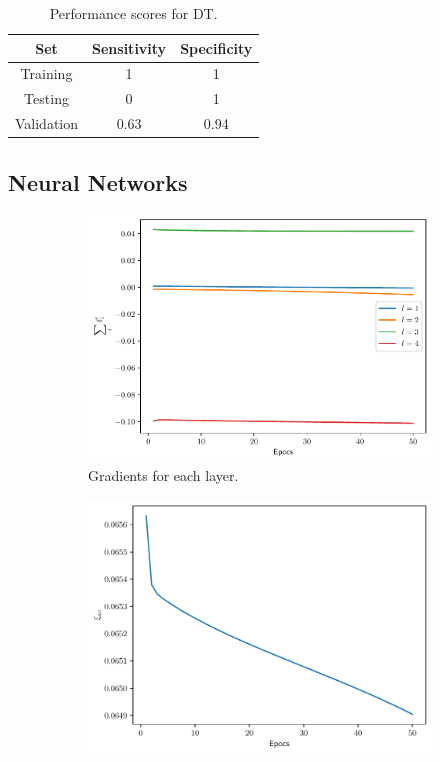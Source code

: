 \documentclass[conference]{IEEEtran}
\theoremstyle{definition}
\theoremstyle{remark}
\theoremstyle{remark}
\begin{document}
\begin{table}[H]
  \centering
  \caption{Performance scores for DT.}
  \label{tab:DT_emb}
  \begin{tabular}{ccc}
    \hline
    \textbf{Set} & \textbf{Sensitivity} & \textbf{Specificity} \\ \hline
    Training & 1 & 1 \\
    Testing & 0 & 1 \\
    Validation & 0.63 & 0.94 \\ \hline
  \end{tabular}
\end{table}

\subsection{Neural Networks}
\begin{figure}
  \centering
  \begin{subfigure}[b]{0.3\textwidth}
    \centering
    \includegraphics[width=\textwidth]{figs/2-3-3-0.9-emb-gradients.pdf}
    \caption{Gradients for each layer.}
  \end{subfigure}
  \begin{subfigure}[b]{0.3\textwidth}
    \centering \includegraphics[width=\textwidth]{figs/2-3-3-0.9-emb-error.pdf}

\end{subfigure}
\end{figure}
\end{document}

